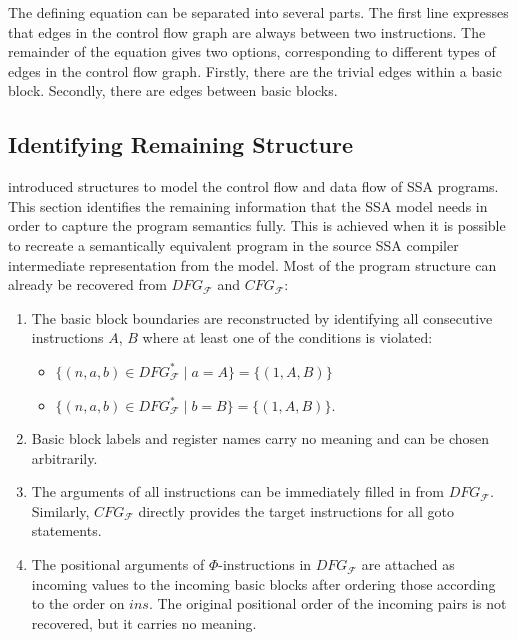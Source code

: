     The defining equation can be separated into several parts.
    The first line expresses that edges in the control flow graph are always
    between two instructions.
    The remainder of the equation gives two options, corresponding to different
    types of edges in the control flow graph.
    Firstly, there are the trivial edges within a basic block.
    Secondly, there are edges between basic blocks.


\subsection{Identifying Remaining Structure}
\label{sec:remainingstructure}

     introduced structures to model the control flow
    and data flow of SSA programs.
    This section identifies the remaining information that the SSA model needs
    in order to capture the program semantics fully.
    This is achieved when it is possible to recreate a semantically equivalent
    program in the source SSA compiler intermediate representation from the
    model.
    Most of the program structure can already be recovered from $DFG_\mathcal F$
    and $CFG_\mathcal F$:

\begin{enumerate}
    \item The basic block boundaries are reconstructed by identifying all
          consecutive instructions $A$, $B$ where at least one of the
          conditions is violated:
    \begin{itemize}
        \item $\{(n,a,b)\in DFG_\mathcal F^*\mid a=A\}=\{(1,A,B)\}$
        \item $\{(n,a,b)\in DFG_\mathcal F^*\mid b=B\}=\{(1,A,B)\}$.
    \end{itemize}
    \item Basic block labels and register names carry no meaning and can be
          chosen arbitrarily.
    \item The arguments of all instructions can be immediately filled in from 
          $DFG_\mathcal F$.
          Similarly, $CFG_\mathcal F$ directly provides the target instructions
          for all goto statements.
    \item The positional arguments of $\Phi$-instructions in $DFG_\mathcal F$
          are attached as incoming values to the incoming basic blocks
          after ordering those according to the order on $ins$.
          The original positional order of the incoming pairs is
          not recovered, but it carries no meaning.
\end{enumerate}

